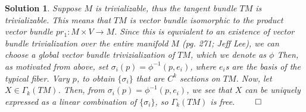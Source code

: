 \documentclass{article} %
\theoremstyle{quest}
\newtheorem*{solution}{Solution}
\begin{document}
\begin{solution}
Suppose $M$ is trivializable, thus the tangent bundle $TM$ is trivializable.
This means that $TM$ is vector bundle isomorphic to the product vector bundle 
$pr_1: M \times V \to M$. Since this is equvialent to an existence of vector bundle 
trivialization over the entire manifold $M$ (pg. 271; Jeff Lee), 
we can choose a global vector bundle trivizialization of $TM$, which we denote as $\phi$
Then, as motivated from above, set $\sigma_i(p) = \phi^{-1}(p,e_i)$, where $e_i$s
are the basis of the typical fiber. Vary $p$, to obtain $\{\sigma_i\}$ 
that are $C^k$ sections on $TM$. Now, let $X \in \Gamma_k(TM)$. Then, 
from $\sigma_i(p) = \phi^{-1}(p,e_i)$, we see that $X$ can be uniquely expressed
as a linear combination of $\{\sigma_i\}$, so $\Gamma_k(TM)$ is free. \hfill
$\qed$    
 

\end{solution}
\end{document}
